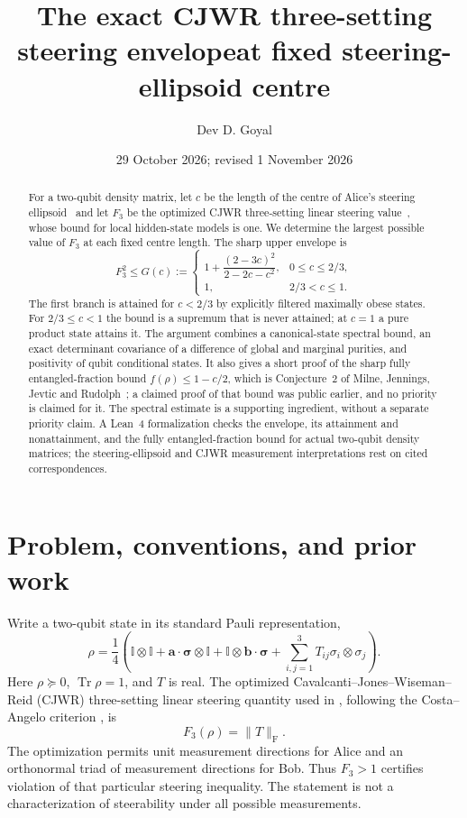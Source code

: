 \documentclass[11pt]{article}
\title{The exact CJWR three-setting steering envelope\newline at fixed steering-ellipsoid centre}
\author{Dev D. Goyal}
\date{29 October 2026; revised 1 November 2026}
\newcommand{\tr}{\operatorname{Tr}}
\newcommand{\Id}{\mathbb{I}}
\newcommand{\norm}[1]{\lVert #1\rVert}
\begin{document}
\maketitle
\begin{abstract}
For a two-qubit density matrix, let $c$ be the length of the centre of Alice's steering ellipsoid~\cite{Milne} and let $F_3$ be the optimized CJWR three-setting linear steering value~\cite{Costa,Ducuara}, whose bound for local hidden-state models is one. We determine the largest possible value of $F_3$ at each fixed centre length. The sharp upper envelope is
\[
 F_3^2\leq G(c):=
 \begin{cases}
  1+\dfrac{(2-3c)^2}{2-2c-c^2},&0\leq c\leq 2/3,\\[5pt]
  1,&2/3<c\leq1.
 \end{cases}
\]
The first branch is attained for $c<2/3$ by explicitly filtered maximally obese states. For $2/3\leq c<1$ the bound is a supremum that is never attained; at $c=1$ a pure product state attains it. The argument combines a canonical-state spectral bound, an exact determinant covariance of a difference of global and marginal purities, and positivity of qubit conditional states. It also gives a short proof of the sharp fully entangled-fraction bound $f(\rho)\leq1-c/2$, which is Conjecture~2 of Milne, Jennings, Jevtic and Rudolph~\cite{Milne}; a claimed proof of that bound was public earlier, and no priority is claimed for it. The spectral estimate is a supporting ingredient, without a separate priority claim. A Lean~4 formalization checks the envelope, its attainment and nonattainment, and the fully entangled-fraction bound for actual two-qubit density matrices; the steering-ellipsoid and CJWR measurement interpretations rest on cited correspondences.
\end{abstract}

\section{Problem, conventions, and prior work}
Write a two-qubit state in its standard Pauli representation,
\begin{equation}\label{eq:fano}
 \rho=\frac14\left(\Id\otimes\Id+
  \mathbf a\cdot\boldsymbol\sigma\otimes\Id+
  \Id\otimes\mathbf b\cdot\boldsymbol\sigma+
  \sum_{i,j=1}^{3}T_{ij}\sigma_i\otimes\sigma_j\right).
\end{equation}
Here $\rho\succeq0$, $\tr\rho=1$, and $T$ is real. The optimized Cavalcanti--Jones--Wiseman--Reid (CJWR) three-setting linear steering quantity used in \cite{Ducuara}, following the Costa--Angelo criterion \cite{Costa}, is
\begin{equation}\label{eq:f3}
 F_3(\rho)=\norm{T}_{\mathrm F}.
\end{equation}
The optimization permits unit measurement directions for Alice and an orthonormal triad of measurement directions for Bob. Thus $F_3>1$ certifies violation of that particular steering inequality. The statement is not a characterization of steerability under all possible measurements.
\end{document}
